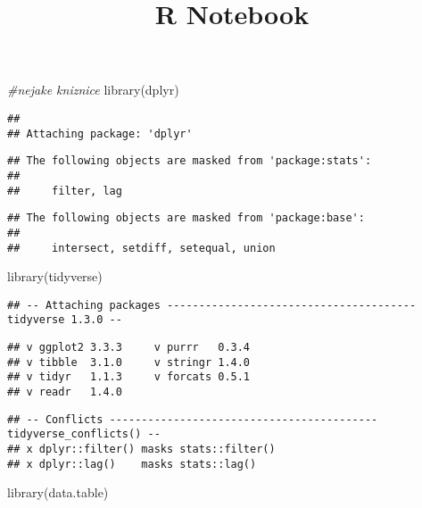 \documentclass[
]{article}
\title{R Notebook}
\author{}
\date{\vspace{-2.5em}}
\newenvironment{Shaded}{\begin{snugshade}}{\end{snugshade}}
\newcommand{\CommentTok}[1]{\textcolor[rgb]{0.56,0.35,0.01}{\textit{#1}}}
\newcommand{\FunctionTok}[1]{\textcolor[rgb]{0.00,0.00,0.00}{#1}}
\newcommand{\NormalTok}[1]{#1}
\begin{document}
\maketitle

\begin{Shaded}
\begin{Highlighting}[]
\CommentTok{\#nejake kniznice}
\FunctionTok{library}\NormalTok{(dplyr)}
\end{Highlighting}
\end{Shaded}

\begin{verbatim}
## 
## Attaching package: 'dplyr'
\end{verbatim}

\begin{verbatim}
## The following objects are masked from 'package:stats':
## 
##     filter, lag
\end{verbatim}

\begin{verbatim}
## The following objects are masked from 'package:base':
## 
##     intersect, setdiff, setequal, union
\end{verbatim}

\begin{Shaded}
\begin{Highlighting}[]
\FunctionTok{library}\NormalTok{(tidyverse)}
\end{Highlighting}
\end{Shaded}

\begin{verbatim}
## -- Attaching packages --------------------------------------- tidyverse 1.3.0 --
\end{verbatim}

\begin{verbatim}
## v ggplot2 3.3.3     v purrr   0.3.4
## v tibble  3.1.0     v stringr 1.4.0
## v tidyr   1.1.3     v forcats 0.5.1
## v readr   1.4.0
\end{verbatim}

\begin{verbatim}
## -- Conflicts ------------------------------------------ tidyverse_conflicts() --
## x dplyr::filter() masks stats::filter()
## x dplyr::lag()    masks stats::lag()
\end{verbatim}

\begin{Shaded}
\begin{Highlighting}[]
\FunctionTok{library}\NormalTok{(data.table)}
\end{Highlighting}
\end{Shaded}
\end{document}
